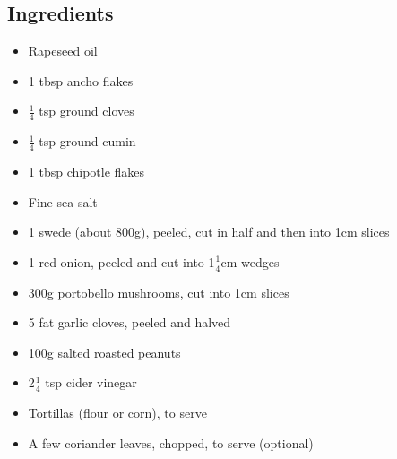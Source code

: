 \documentclass{book}
\begin{document}
\subsection*{Ingredients}
\begin{itemize}
\item Rapeseed oil
\item 1 tbsp ancho flakes
\item $\frac{1}{4}$ tsp ground cloves
\item $\frac{1}{4}$ tsp ground cumin
\item 1 tbsp chipotle flakes
\item Fine sea salt
\item 1 swede (about 800g), peeled, cut in half and then into 1cm slices
\item 1 red onion, peeled and cut into 1$\frac{1}{4}$cm wedges
\item 300g portobello mushrooms, cut into 1cm slices
\item 5 fat garlic cloves, peeled and halved
\item 100g salted roasted peanuts
\item 2$\frac{1}{4}$ tsp cider vinegar
\item Tortillas (flour or corn), to serve 
\item A few coriander leaves, chopped, to serve (optional) 
\end{itemize}
\end{document}
